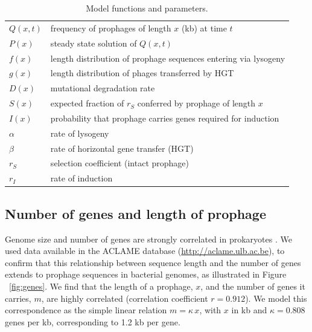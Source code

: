 \begin{table}[H]
\centering
\begin{tabular}{ p{2cm}p{12cm}}
\hline
$Q(x, t)$ & frequency of prophages of length $x$ (kb) at time $t$ \\
$P(x)$ & steady state solution of $Q(x,t)$\\
$f(x)$& length distribution of prophage sequences entering via lysogeny\\
$g(x)$ & length distribution of phages transferred by HGT\\
$D(x)$ &  mutational degradation rate\\
$S(x)$ & expected fraction of $r_S$ conferred by prophage of length $x$\\
$I(x)$ & probability that prophage carries genes required for induction\\

\hline
$\alpha$&  rate of lysogeny\\
$\beta$ & rate of horizontal gene transfer (HGT)\\
$r_{S}$ & selection coefficient (intact prophage)\\
$r_{I}$ & rate of induction\\
\hline
\end{tabular}
\caption{Model functions and parameters.}
\label{table:2M}
\end{table}

\subsection{Number of genes and length of prophage}\label{genes}

Genome size and number of genes are strongly correlated in prokaryotes \citep{gregory_synergy_2005}. 
 We used data available in the ACLAME database (\href{http://aclame.ulb.ac.be/}{http://aclame.ulb.ac.be}), to confirm that this relationship between sequence length and the number of genes extends to prophage sequences in bacterial genomes, as illustrated in Figure ~\ref{fig:genes}.   We find that the length of a prophage, $x$, and the number of genes it carries, $m$, are highly correlated (correlation coefficient $r = 0.912$).  We model this correspondence as the simple linear relation 
 $m = \kappa \,x$, with $x$ in kb and $\kappa = 0.808$ genes per kb, corresponding to 1.2 kb per gene.
 

